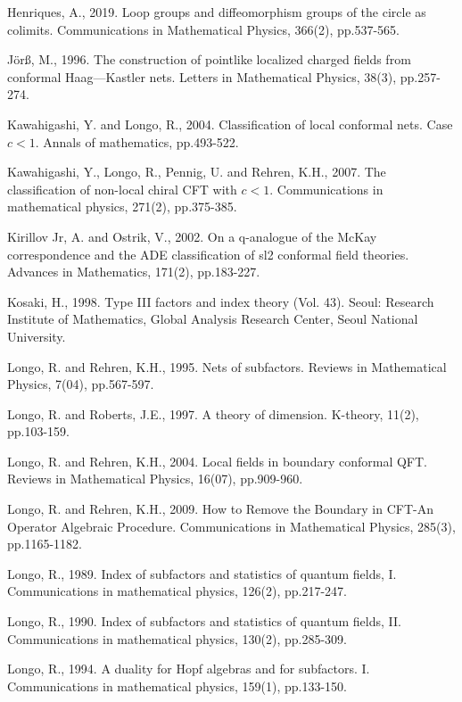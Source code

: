 \documentclass[11pt,b5paper,notitlepage]{article}
\theoremstyle{definition}
\theoremstyle{plain}
\numberwithin{equation}{section}
\begin{document}
\begin{thebibliography}{999999}
Henriques, A., 2019. Loop groups and diffeomorphism groups of the circle as colimits. Communications in Mathematical Physics, 366(2), pp.537-565.

J\"or\ss, M., 1996. The construction of pointlike localized charged fields from conformal Haag—Kastler nets. Letters in Mathematical Physics, 38(3), pp.257-274.

Kawahigashi, Y. and Longo, R., 2004. Classification of local conformal nets. Case $c<1$. Annals of mathematics, pp.493-522.

Kawahigashi, Y., Longo, R., Pennig, U. and Rehren, K.H., 2007. The classification of non-local chiral CFT with $c<1$. Communications in mathematical physics, 271(2), pp.375-385.

Kirillov Jr, A. and Ostrik, V., 2002. On a q-analogue of the McKay correspondence and the ADE classification of sl2 conformal field theories. Advances in Mathematics, 171(2), pp.183-227.

Kosaki, H., 1998. Type III factors and index theory (Vol. 43). Seoul: Research Institute of Mathematics, Global Analysis Research Center, Seoul National University.

Longo, R. and Rehren, K.H., 1995. Nets of subfactors. Reviews in Mathematical Physics, 7(04), pp.567-597.

Longo, R. and Roberts, J.E., 1997. A theory of dimension. K-theory, 11(2), pp.103-159.

Longo, R. and Rehren, K.H., 2004. Local fields in boundary conformal QFT. Reviews in Mathematical Physics, 16(07), pp.909-960.

Longo, R. and Rehren, K.H., 2009. How to Remove the Boundary in CFT-An Operator Algebraic Procedure. Communications in Mathematical Physics, 285(3), pp.1165-1182.

Longo, R., 1989. Index of subfactors and statistics of quantum fields, I. Communications in mathematical physics, 126(2), pp.217-247.

Longo, R., 1990. Index of subfactors and statistics of quantum fields, II. Communications in mathematical physics, 130(2), pp.285-309.

Longo, R., 1994. A duality for Hopf algebras and for subfactors. I. Communications in mathematical physics, 159(1), pp.133-150.


\end{thebibliography}
\end{document}
